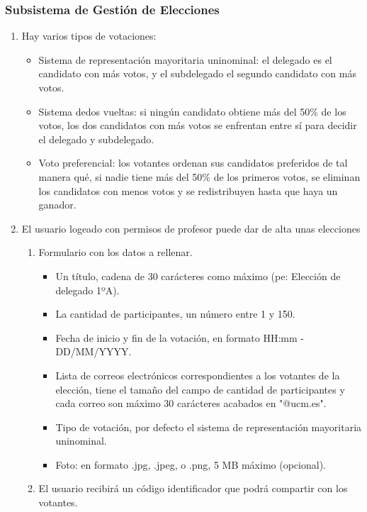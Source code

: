\documentclass{article}
\begin{document}
        \subsubsection{Subsistema de Gestión de Elecciones}
        \begin{enumerate}[label=\textbf{SGE-RF(\arabic*)}, labelwidth=25mm, labelsep=2mm, itemindent=0mm, leftmargin=*, align=parleft] 
            \item Hay varios tipos de votaciones:
            \begin{itemize}
                \item Sistema de representación mayoritaria uninominal: el delegado es el candidato con más votos, y el subdelegado el segundo candidato con más votos.
                \item Sistema dedos vueltas: si ningún candidato obtiene más del 50\% de los votos, los dos candidatos con más votos se enfrentan entre sí para decidir el delegado y subdelegado.
                \item Voto preferencial: los votantes ordenan sus candidatos preferidos de tal manera qué, si nadie tiene más del 50\% de los primeros votos, se eliminan los candidatos con menos votos y se redistribuyen hasta que haya un ganador.
            \end{itemize}
            \item El usuario logeado con permisos de profesor puede dar de alta unas elecciones
            \begin{adjustwidth}{15mm}{0mm}
                \begin{enumerate}[label=\textbf{SGE-RF(2.\arabic*)}]
                    \item Formulario con los datos a rellenar.
                        \begin{itemize}
                            \item Un título, cadena de 30 carácteres como máximo (pe: Elección de delegado 1ºA).
                            \item La cantidad de participantes, un número entre 1 y 150.
                            \item Fecha de inicio y fin de la votación, en formato HH:mm - DD/MM/YYYY.
                            \item Lista de correos electrónicos correspondientes a los votantes de la elección, tiene el tamaño del campo de cantidad de participantes y cada correo son máximo 30 carácteres acabados en "@ucm.es".
                            \item Tipo de votación, por defecto el sistema de representación mayoritaria uninominal.
                            \item Foto: en formato .jpg, .jpeg, o .png, 5 MB máximo (opcional).
                        \end{itemize}
                    \item El usuario recibirá un código identificador que podrá compartir con los votantes.
                \end{enumerate}
            \end{adjustwidth}
        

\end{enumerate}
\end{document}
